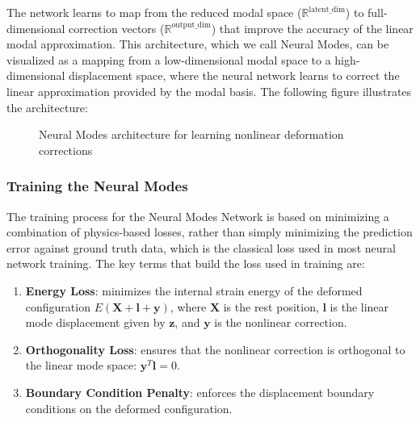 The network learns to map from the reduced modal space (\( \mathbb{R}^{\text{latent\_dim}} \)) to full-dimensional correction vectors (\( \mathbb{R}^{\text{output\_dim}} \)) that improve the accuracy of the linear modal approximation. This architecture, which we call Neural Modes, can be visualized as a mapping from a low-dimensional modal space to a high-dimensional displacement space, where the neural network learns to correct the linear approximation provided by the modal basis. The following figure illustrates the architecture:
\begin{figure}[H]    \centering
    \caption{Neural Modes architecture for learning nonlinear deformation corrections}
    \label{fig:neural_modes_arch}
\end{figure}



\subsubsection{Training the Neural Modes} %
The training process for the Neural Modes Network is based on minimizing a combination of physics-based losses, rather than simply minimizing the prediction error against ground truth data, which is the classical loss used in most neural network training. The key terms that build the loss used in training are:

\begin{enumerate}
    \item \textbf{Energy Loss}: minimizes the internal strain energy of the deformed configuration $E(\bm{X} + \bm{l} + \bm{y})$, where $\bm{X}$ is the rest position, $\bm{l}$ is the linear mode displacement given by $\bm{z}$, and $\bm{y}$ is the nonlinear correction.
    
    \item \textbf{Orthogonality Loss}: ensures that the nonlinear correction is orthogonal to the linear mode space: $\bm{y}^T \bm{l} = 0$.

    \item \textbf{Boundary Condition Penalty}: enforces the displacement boundary conditions on the deformed configuration.
    
\end{enumerate}

